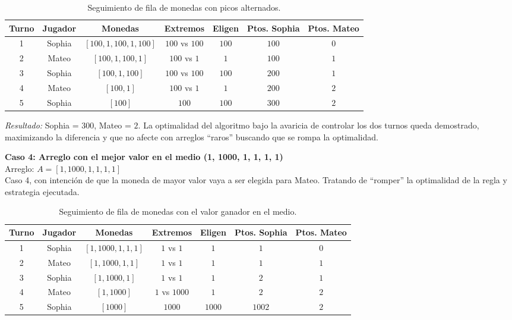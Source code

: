 \begin{table}[H]
    \centering
    \renewcommand{\arraystretch}{1.2}
    \begin{tabular}{|c|c|c|c|c|c|c|}
    \hline
    \textbf{Turno} & \textbf{Jugador} & \textbf{Monedas} & \textbf{Extremos} & \textbf{Eligen} & \textbf{Ptos. Sophia} & \textbf{Ptos. Mateo} \\ \hline
    1 & Sophia & $[100, 1, 100, 1, 100]$ & $100$ vs $100$ & $100$ & $100$ & $0$ \\ \hline
    2 & Mateo & $[100, 1, 100, 1]$ & $100$ vs $1$ & $1$ & $100$ & $1$ \\ \hline
    3 & Sophia & $[100, 1, 100]$ & $100$ vs $100$ & $100$ & $200$ & $1$ \\ \hline
    4 & Mateo & $[100, 1]$ & $100$ vs $1$ & $1$ & $200$ & $2$ \\ \hline
    5 & Sophia & $[100]$ & $100$ & $100$ & $300$ & $2$ \\ \hline
    \end{tabular}
    \caption{Seguimiento de fila de monedas con picos alternados.}
    \label{tab:caso3}
\end{table}

\textit{Resultado:} Sophia = $300$, Mateo = $2$. La optimalidad del algoritmo bajo la avaricia de controlar los dos turnos queda demostrado, maximizando la diferencia y que no afecte con arreglos ``raros'' buscando que se rompa la optimalidad.

\vspace{6px}
\textbf{Caso 4: Arreglo con el mejor valor en el medio (1, 1000, 1, 1, 1, 1)}
\\
Arreglo: $A = [1, 1000, 1, 1, 1, 1]$
\\
Caso 4, con intención de que la moneda de mayor valor vaya a ser elegida para Mateo. Tratando de ``romper'' la optimalidad de la regla y estrategia ejecutada.

\begin{table}[H]
    \centering
    \renewcommand{\arraystretch}{1.2}
    \begin{tabular}{|c|c|c|c|c|c|c|}
    \hline
    \textbf{Turno} & \textbf{Jugador} & \textbf{Monedas} & \textbf{Extremos} & \textbf{Eligen} & \textbf{Ptos. Sophia} & \textbf{Ptos. Mateo} \\ \hline
    1 & Sophia & $[1, 1000, 1, 1, 1]$ & $1$ vs $1$ & $1$ & $1$ & $0$ \\ \hline
    2 & Mateo & $[1, 1000, 1, 1]$ & $1$ vs $1$ & $1$ & $1$ & $1$ \\ \hline
    3 & Sophia & $[1, 1000, 1]$ & $1$ vs $1$ & $1$ & $2$ & $1$ \\ \hline
    4 & Mateo & $[1, 1000]$ & $1$ vs $1000$ & $1$ & $2$ & $2$ \\ \hline
    5 & Sophia & $[1000]$ & $1000$ & $1000$ & $1002$ & $2$ \\ \hline
    \end{tabular}
    \caption{Seguimiento de fila de monedas con el valor ganador en el medio.}
    \label{tab:caso4}
\end{table}

